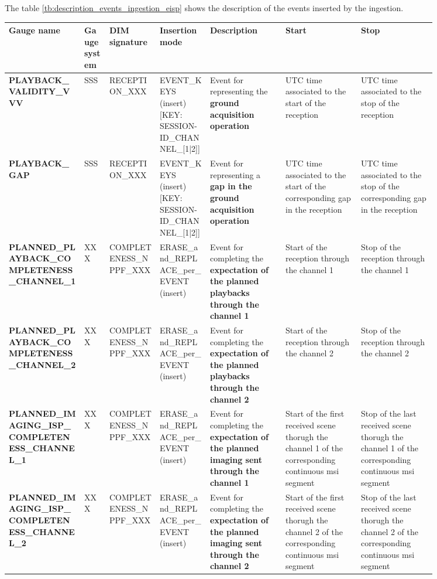 The table \ref{tb:description_events_ingestion_eisp} shows the description of the events inserted by the ingestion.

\begin{landscape}
\begin{longtable}{|M{0.15\linewidth}|M{0.05\linewidth}|M{0.10\linewidth}|M{0.10\linewidth}|M{0.15\linewidth}|M{0.15\linewidth}|M{0.15\linewidth}|}
\hline \textbf{Gauge name} & \textbf{Gauge system} & \textbf{DIM signature} & \textbf{Insertion mode} & \textbf{Description} & \textbf{Start} & \textbf{Stop} \\ \hline
\textbf{PLAYBACK\_VALIDITY\_VVV} & SSS & \- RECEPTION\_XXX & EVENT\_KEYS (insert) [KEY: SESSION-ID\_CHANNEL\_[1|2]] & Event for representing the \textbf{ground acquisition operation} & UTC time associated to the start of the reception & UTC time associated to the stop of the reception \\ \hline
\textbf{PLAYBACK\_GAP} & SSS & \- RECEPTION\_XXX & EVENT\_KEYS (insert) [KEY: SESSION-ID\_CHANNEL\_[1|2]] & Event for representing a \textbf{gap in the ground acquisition operation} & UTC time associated to the start of the corresponding gap in the reception & UTC time associated to the stop of the corresponding gap in the reception \\ \hline
\textbf{PLANNED\_PLAYBACK\_COMPLETENESS\_CHANNEL\_1} & XXX & \- COMPLETENESS\_NPPF\_XXX & ERASE\_and\_REPLACE\_per\_EVENT (insert) & Event for completing the \textbf{expectation of the planned playbacks through the channel 1} & Start of the reception through the channel 1 & Stop of the reception through the channel 1 \\ \hline
\textbf{PLANNED\_PLAYBACK\_COMPLETENESS\_CHANNEL\_2} & XXX & \- COMPLETENESS\_NPPF\_XXX & ERASE\_and\_REPLACE\_per\_EVENT (insert) & Event for completing the \textbf{expectation of the planned playbacks through the channel 2} & Start of the reception through the channel 2 & Stop of the reception through the channel 2 \\ \hline
\textbf{PLANNED\_IMAGING\_ISP\_COMPLETENESS\_CHANNEL\_1} & XXX & \- COMPLETENESS\_NPPF\_XXX & ERASE\_and\_REPLACE\_per\_EVENT (insert) & Event for completing the \textbf{expectation of the planned imaging sent through the channel 1} & Start of the first received scene thorugh the channel 1 of the corresponding continuous \acrshort{msi} segment & Stop of the last received scene thorugh the channel 1 of the corresponding continuous \acrshort{msi} segment \\ \hline
\textbf{PLANNED\_IMAGING\_ISP\_COMPLETENESS\_CHANNEL\_2} & XXX & \- COMPLETENESS\_NPPF\_XXX & ERASE\_and\_REPLACE\_per\_EVENT (insert) & Event for completing the \textbf{expectation of the planned imaging sent through the channel 2} & Start of the first received scene thorugh the channel 2 of the corresponding continuous \acrshort{msi} segment & Stop of the last received scene thorugh the channel 2 of the corresponding continuous \acrshort{msi} segment \\ \hline

\end{longtable}
\end{landscape}

